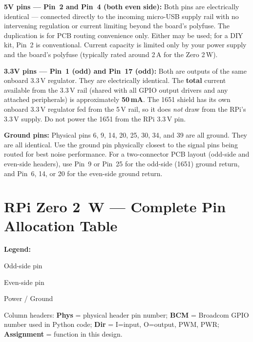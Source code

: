 \documentclass[11pt,a4paper]{article}
\begin{document}
\begin{warnbox}
\textbf{5V pins --- Pin~2 and Pin~4 (both even side):}
Both pins are electrically identical --- connected directly to the
incoming micro-USB supply rail with no intervening regulation or
current limiting beyond the board's polyfuse.
The duplication is for PCB routing convenience only.
Either may be used; for a DIY kit, Pin~2 is conventional.
Current capacity is limited only by your power supply and the board's
polyfuse (typically rated around 2\,A for the Zero 2\,W).

\smallskip
\textbf{3.3V pins --- Pin~1 (odd) and Pin~17 (odd):}
Both are outputs of the same onboard 3.3\,V regulator.
They are electrically identical.
The \textbf{total} current available from the 3.3\,V rail
(shared with all GPIO output drivers and any attached peripherals)
is approximately \textbf{50\,mA}.
The 1651 shield has its own onboard 3.3\,V regulator fed from the 5\,V
rail, so it does \emph{not} draw from the RPi's 3.3\,V supply.
Do not power the 1651 from the RPi 3.3\,V pin.

\smallskip
\textbf{Ground pins:}
Physical pins 6, 9, 14, 20, 25, 30, 34, and 39 are all ground.
They are all identical. Use the ground pin physically closest to
the signal pins being routed for best noise performance.
For a two-connector PCB layout (odd-side and even-side headers),
use Pin~9 or Pin~25 for the odd-side (1651) ground return,
and Pin~6, 14, or 20 for the even-side ground return.
\end{warnbox}

\section{RPi Zero 2~W --- Complete Pin Allocation Table}

\textbf{Legend:} \colorbox{oddcol}{\strut Odd-side pin} \quad
\colorbox{evencol}{\strut Even-side pin} \quad
\colorbox{pwrcol}{\strut Power / Ground}

\smallskip
Column headers: \textbf{Phys} = physical header pin number;
\textbf{BCM} = Broadcom GPIO number used in Python code;
\textbf{Dir} = I=input, O=output, PWM, PWR;
\textbf{Assignment} = function in this design.

\vspace{6pt}

\setlength{\tabcolsep}{4pt}
\renewcommand{\arraystretch}{1.30}
\end{document}
